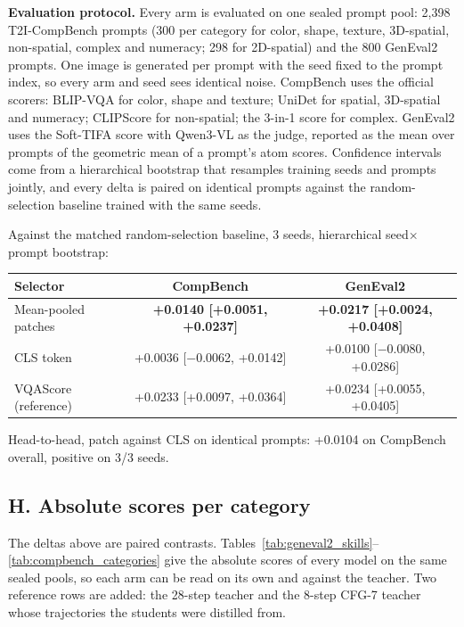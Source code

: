 \documentclass[11pt,a4paper]{article}
\begin{document}
\noindent\textbf{Evaluation protocol.} Every arm is evaluated on one sealed prompt pool: 2{,}398 T2I-CompBench prompts (300 per category for color, shape, texture, 3D-spatial, non-spatial, complex and numeracy; 298 for 2D-spatial) and the 800 GenEval2 prompts. One image is generated per prompt with the seed fixed to the prompt index, so every arm and seed sees identical noise. CompBench uses the official scorers: BLIP-VQA for color, shape and texture; UniDet for spatial, 3D-spatial and numeracy; CLIPScore for non-spatial; the 3-in-1 score for complex. GenEval2 uses the Soft-TIFA score with Qwen3-VL as the judge, reported as the mean over prompts of the geometric mean of a prompt's atom scores. Confidence intervals come from a hierarchical bootstrap that resamples training seeds and prompts jointly, and every delta is paired on identical prompts against the random-selection baseline trained with the same seeds.

Against the matched random-selection baseline, 3 seeds, hierarchical seed$\times$prompt bootstrap:

\begin{table}[ht]
\centering
\begin{tabular}{lcc}
\toprule
Selector & CompBench & GenEval2 \\
\midrule
Mean-pooled patches & \textbf{+0.0140 [+0.0051, +0.0237]} & \textbf{+0.0217 [+0.0024, +0.0408]} \\
CLS token & +0.0036 [$-$0.0062, +0.0142] & +0.0100 [$-$0.0080, +0.0286] \\
VQAScore (reference) & +0.0233 [+0.0097, +0.0364] & +0.0234 [+0.0055, +0.0405] \\
\bottomrule
\end{tabular}
\end{table}

\noindent Head-to-head, patch against CLS on identical prompts: +0.0104 on CompBench overall, positive on 3/3 seeds.

\subsection*{H. Absolute scores per category}

The deltas above are paired contrasts. Tables~\ref{tab:geneval2_skills}--\ref{tab:compbench_categories} give the absolute scores of every model on the same sealed pools, so each arm can be read on its own and against the teacher. Two reference rows are added: the 28-step teacher and the 8-step CFG-7 teacher whose trajectories the students were distilled from.
\end{document}
